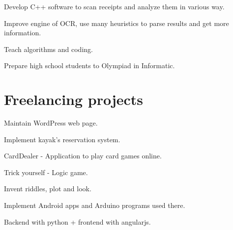 \documentclass[]{deedy-resume-openfont}
\begin{document}
\begin{minipage}[t]{0.66\textwidth}
\begin{tightemize}
\item Develop C++ software to scan receipts and analyze them in various way.
\item Improve engine of OCR, use many heuristics to parse results and get more information.
\end{tightemize}
\sectionsep

\begin{tightemize}
\item Teach algorithms and coding.
\item Prepare high school students to Olympiad in Informatic.
\end{tightemize}
\sectionsep


\section{Freelancing projects}
\begin{tightemize}
\item Maintain WordPress web page.
\item Implement kayak's reservation system.
\end{tightemize}
\sectionsep


\sectionsep
{}
\begin{tightemize}
\item CardDealer - Application to play card games online.
\item Trick yourself - Logic game.
\end{tightemize}
\sectionsep

\begin{tightemize}
\item Invent riddles, plot and look. 
\item Implement Android apps and Arduino programs used there.

\end{tightemize}
\sectionsep

\begin{tightemize}
\item Backend with python + frontend with angularjs. 



\end{tightemize}
\end{minipage}
\end{document}
